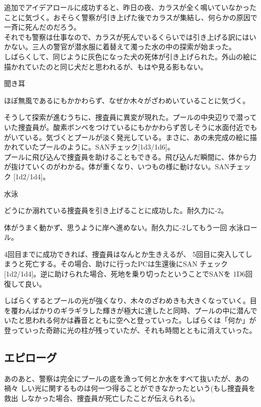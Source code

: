 \documentclass[a4paper,8pt,min]{jsarticle}
\begin{document}
追加でアイデアロールに成功すると、昨日の夜、カラスが全く鳴いていなかった
ことに気づく。おそらく警察が引き上げた後でカラスが集結し、何らかの原因で
一斉に死んだのだろう。\\

それでも警察は仕事なので、カラスが死んでいるくらいでは引き上げる訳にはい
かない。三人の警官が潜水服に着替えて濁った水の中の探索が始まった。\\

しばらくして、同じように灰色になった犬の死体が引き上げられた。外山の絵に
描かれていたのと同じ犬だと思われるが、もはや見る影もない。\\

\begin{judge}{聞き耳}
 \item ほぼ無風であるにもかかわらず、なぜか木々がざわめいていることに気づく。
\end{judge}

そうして探索が進むうちに、捜査員に異変が現れた。プールの中央辺りで潜って
いた捜査員が。酸素ボンベをつけているにもかかわらず苦しそうに水面付近でも
がいている。気づくとプールが淡く発光している。まさに、あの未完成の絵に描
かれていたプールのように。SANチェック[1d3/1d6]。\\

プールに飛び込んで捜査員を助けることもできる。飛び込んだ瞬間に、体から力
が抜けていくのがわかる。体が重くなり、いつもの様に動けない。SANチェック
[1d2/1d4]。\\

\begin{judge}{水泳}
 \item どうにか溺れている捜査員を引き上げることに成功した。耐久力に-2。
 \item 体がうまく動かず、思うように岸へ進めない。耐久力に-2してもう一回
 水泳ロール。
\end{judge}

4回目までに成功できれば、捜査員はなんとか生きえるが、
5回目に突入してしまうと死亡する。その場合、助けに行ったPCは生還後にSAN
チェック[1d2/1d4]。逆に助けられた場合、死地を乗り切ったということでSANを
1D6回復して良い。

しばらくするとプールの光が強くなり、木々のざわめきも大きくなっていく。目
を覆わんばかりのギラギラした輝きが極大に達したと同時、プールの中に潜んで
いたと思われる何かは轟音とともに空へと登っていった。しばらくは「何か」が
登っていった奇跡に光の柱が残っていたが、それも時間とともに消えていった。


\newpage
\subsection{エピローグ}
あのあと、警察は完全にプールの底を漁って何とか水をすべて抜いたが、あの禍々
しい光に関するものは何一つ得ることができなかったという(もし捜査員を救出
しなかった場合、捜査員が死亡したことが伝えられる)。\\
\end{document}
